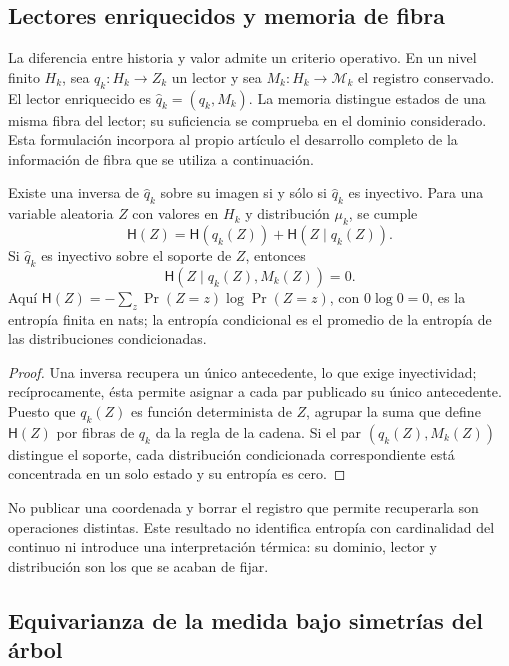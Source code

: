 \subsection{Lectores enriquecidos y memoria de fibra}
\label{sec:ch-memoria-fibra}

La diferencia entre historia y valor admite un criterio operativo. En un
nivel finito \(H_k\), sea \(q_k:H_k\to Z_k\) un lector y sea
\(M_k:H_k\to\mathcal M_k\) el registro conservado. El lector enriquecido
es \(\widehat q_k=(q_k,M_k)\). La memoria distingue estados de una misma
fibra del lector; su suficiencia se comprueba en el dominio considerado.
Esta formulación incorpora al propio artículo el desarrollo completo de la
información de fibra que se utiliza a continuación.

\begin{proposition}
\label{prop:ch-recuperabilidad-fibra}
Existe una inversa de \(\widehat q_k\) sobre su imagen si y sólo si
\(\widehat q_k\) es inyectivo. Para una variable aleatoria \(Z\) con
valores en \(H_k\) y distribución \(\mu_k\), se cumple
\[
 \mathsf H(Z)=\mathsf H(q_k(Z))+\mathsf H(Z\mid q_k(Z)).
\]
Si \(\widehat q_k\) es inyectivo sobre el soporte de \(Z\), entonces
\[
 \mathsf H(Z\mid q_k(Z),M_k(Z))=0.
\]
Aquí \(\mathsf H(Z)=-\sum_z\Pr(Z=z)\log\Pr(Z=z)\), con
\(0\log0=0\), es la entropía finita en nats; la entropía condicional es
el promedio de la entropía de las distribuciones condicionadas.
\end{proposition}

\begin{proof}
Una inversa recupera un único antecedente, lo que exige inyectividad;
recíprocamente, ésta permite asignar a cada par publicado su único
antecedente. Puesto que \(q_k(Z)\) es función determinista de \(Z\),
agrupar la suma que define \(\mathsf H(Z)\) por fibras de \(q_k\) da la
regla de la cadena. Si el par \((q_k(Z),M_k(Z))\) distingue el soporte,
cada distribución condicionada correspondiente está concentrada en un solo
estado y su entropía es cero.
\end{proof}

No publicar una coordenada y borrar el registro que permite recuperarla son
operaciones distintas. Este resultado no identifica entropía con cardinalidad
del continuo ni introduce una interpretación térmica: su dominio, lector y
distribución son los que se acaban de fijar.

\subsection{Equivarianza de la medida bajo simetrías del árbol}
\label{sec:ch-naturalidad-medida}

